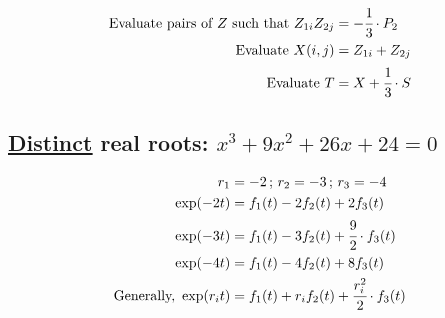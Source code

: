 \documentclass[12pt,a4paper]{article}
\begin{document}
\begin{align}
  \text{Evaluate pairs of }Z\text{ such that } Z_{1i} Z_{2j} &= -\cfrac{1}{3}\cdot P_2 \\
  \text{Evaluate } X(i,j) &= Z_{1i} + Z_{2j} \\
  \text{Evaluate } T &= X + \cfrac{1}{3}\cdot S
\end{align}

\subsection{\href{https://www.wolframalpha.com/input/?i=e\%5Ex+\%2B+x\%5E2\%2F2+*+(-e\%5E(-2)+\%2B+2e\%5E(-3)+-+e\%5E(-4))+\%2B+x+*+(-7\%2F2+e\%5E(-2)+\%2B+6+e\%5E(-3)+-+5\%2F2+e\%5E(-4))+-6+e\%5E(-2)+\%2B+8e\%5E(-3)+-+3+e\%5E(-4)+\%3D+0}{\color{blue}\underline{Distinct}} real roots: $x^3 + 9x^2 + 26x + 24 = 0$}

\begin{align}
r_1 &= -2\,;\,r_2 = -3\,;\,r_3 = -4 \\
\exp (-2t) &= f_1(t) - 2 f_2(t) + 2 f_3(t) \\
\exp (-3t) &= f_1(t) - 3 f_2(t) + \cfrac{9}{2} \cdot f_3(t) \\
\exp (-4t) &= f_1(t) - 4 f_2(t) + 8 f_3(t) \\
\text{Generally, } \exp (r_i t) &= f_1(t) + r_i f_2(t) + \cfrac{r_i^2}{2} \cdot f_3(t)
\end{align}
\end{document}
